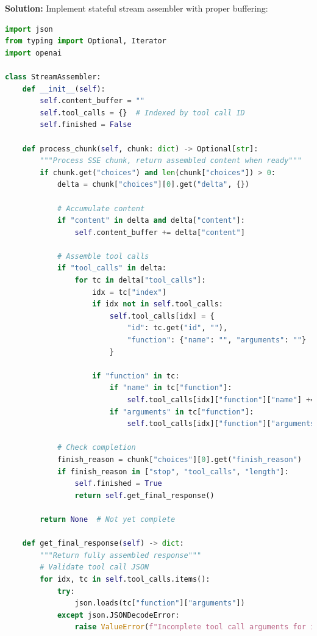 \documentclass[11pt]{article}
\begin{document}
\textbf{Solution:} Implement stateful stream assembler with proper buffering:

\begin{lstlisting}[language=Python]
import json
from typing import Optional, Iterator
import openai

class StreamAssembler:
    def __init__(self):
        self.content_buffer = ""
        self.tool_calls = {}  # Indexed by tool call ID
        self.finished = False

    def process_chunk(self, chunk: dict) -> Optional[str]:
        """Process SSE chunk, return assembled content when ready"""
        if chunk.get("choices") and len(chunk["choices"]) > 0:
            delta = chunk["choices"][0].get("delta", {})

            # Accumulate content
            if "content" in delta and delta["content"]:
                self.content_buffer += delta["content"]

            # Assemble tool calls
            if "tool_calls" in delta:
                for tc in delta["tool_calls"]:
                    idx = tc["index"]
                    if idx not in self.tool_calls:
                        self.tool_calls[idx] = {
                            "id": tc.get("id", ""),
                            "function": {"name": "", "arguments": ""}
                        }

                    if "function" in tc:
                        if "name" in tc["function"]:
                            self.tool_calls[idx]["function"]["name"] += tc["function"]["name"]
                        if "arguments" in tc["function"]:
                            self.tool_calls[idx]["function"]["arguments"] += tc["function"]["arguments"]

            # Check completion
            finish_reason = chunk["choices"][0].get("finish_reason")
            if finish_reason in ["stop", "tool_calls", "length"]:
                self.finished = True
                return self.get_final_response()

        return None  # Not yet complete

    def get_final_response(self) -> dict:
        """Return fully assembled response"""
        # Validate tool call JSON
        for idx, tc in self.tool_calls.items():
            try:
                json.loads(tc["function"]["arguments"])
            except json.JSONDecodeError:
                raise ValueError(f"Incomplete tool call arguments for index {idx}")


\end{lstlisting}
\end{document}
